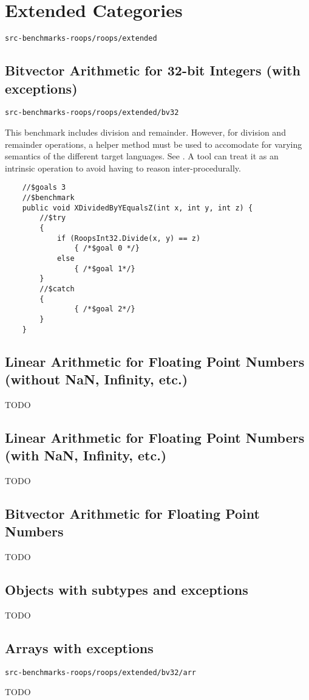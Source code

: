\section{Extended Categories}

\verb|src-benchmarks-roops/roops/extended|

\subsection{Bitvector Arithmetic for 32-bit Integers (with exceptions)}

\verb|src-benchmarks-roops/roops/extended/bv32|

This benchmark includes division and remainder.
However, for division and remainder operations, a helper method must be used 
to accomodate for varying semantics of the different target languages.
See . A tool can treat it as an intrinsic operation
to avoid having to reason inter-procedurally.

\begin{verbatim}
    //$goals 3
    //$benchmark
    public void XDividedByYEqualsZ(int x, int y, int z) {
        //$try
        {
            if (RoopsInt32.Divide(x, y) == z)
                { /*$goal 0 */}
            else
                { /*$goal 1*/}
        }
        //$catch
        {
                { /*$goal 2*/}
        }
    }
\end{verbatim}

\subsection{Linear Arithmetic for Floating Point Numbers (without NaN, Infinity, etc.)}
TODO
\subsection{Linear Arithmetic for Floating Point Numbers (with NaN, Infinity, etc.)}
TODO
\subsection{Bitvector Arithmetic for Floating Point Numbers}
TODO

\subsection{Objects with subtypes and exceptions}
TODO

\subsection{Arrays with exceptions}

\verb|src-benchmarks-roops/roops/extended/bv32/arr|

TODO
